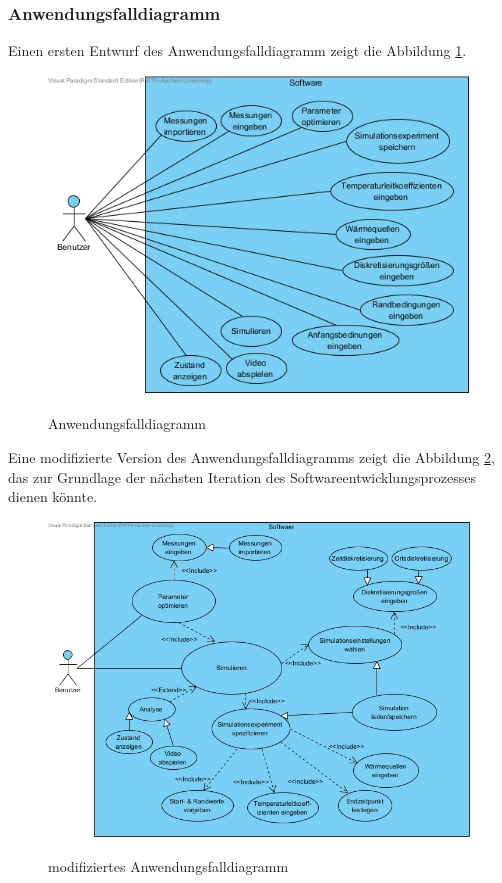 \subsubsection{Anwendungsfalldiagramm}\label{Anwendungsfalldiagramm}
Einen ersten Entwurf des Anwendungsfalldiagramm zeigt die Abbildung \ref{Use Case Diagramm}.
\begin{figure}[H]
	\centering
	\includegraphics[scale=.6]{Bilder/Use_Case_Diagramm.jpg}\\
	\caption{Anwendungsfalldiagramm}
	\label{Use Case Diagramm}
\end{figure}

\noindent
Eine modifizierte Version des Anwendungsfalldiagramms zeigt die Abbildung \ref{Use Case Diagramm2}, das zur Grundlage der nächsten Iteration des Softwareentwicklungsprozesses dienen könnte.
\begin{figure}[H]
	\centering
	\includegraphics[scale=.6]{Bilder/Use_Case_Diagramm_2.jpg}\\
	\caption{modifiziertes Anwendungsfalldiagramm}
	\label{Use Case Diagramm2}
\end{figure}

